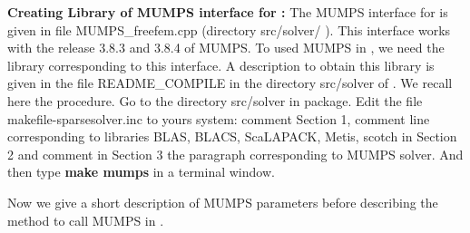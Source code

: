 \documentclass[a4paper,twoside,12pt]{book}
\begin{document}
\begin{paragraph}
{\bf{Creating Library of MUMPS interface for \freefempp:}}  The MUMPS interface for \freefempp is given in file MUMPS\_freefem.cpp (directory src/solver/ ).
This interface works with the release 3.8.3 and 3.8.4 of MUMPS.  To used MUMPS in \freefempp, we need the library corresponding to this interface.
A description to obtain this library is given in the file README\_COMPILE in the directory src/solver of \freefempp. We recall here the procedure. Go to the directory src/solver in \freefempp package. Edit the file makefile-sparsesolver.inc to yours
system: comment Section 1, comment line corresponding to libraries BLAS, BLACS, ScaLAPACK, Metis, scotch in Section 2 and comment in Section 3
the paragraph corresponding to MUMPS solver. And then type {\bf{make mumps}} in a terminal window.
\end{paragraph}



Now we give a short description of MUMPS parameters before describing the method to call MUMPS in \freefempp.
\end{document}
